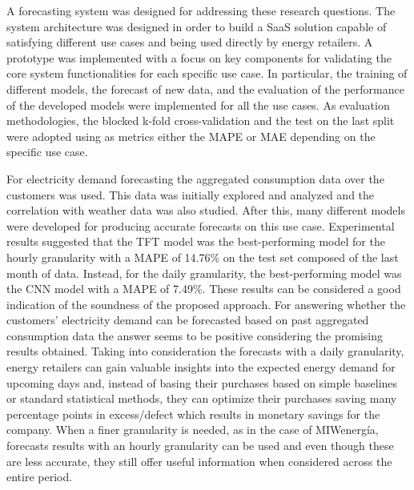 A forecasting system was designed for addressing these research questions.
The system architecture was designed in order to build a SaaS solution capable of satisfying different use cases and being used directly by energy retailers.
A prototype was implemented with a focus on key components for validating the core system functionalities for each specific use case.
In particular, the training of different models, the forecast of new data, and the evaluation of the performance of the developed models were implemented for all the use cases.
As evaluation methodologies, the blocked k-fold cross-validation and the test on the last split were adopted using as metrics either the MAPE or MAE depending on the specific use case.

For electricity demand forecasting the aggregated consumption data over the customers was used.
This data was initially explored and analyzed and the correlation with weather data was also studied.
After this, many different models were developed for producing accurate forecasts on this use case.
Experimental results suggested that the TFT model was the best-performing model for the hourly granularity with a MAPE of 14.76\% on the test set composed of the last month of data.
Instead, for the daily granularity, the best-performing model was the CNN model with a MAPE of 7.49\%.
These results can be considered a good indication of the soundness of the proposed approach.
For answering whether the customers' electricity demand can be forecasted based on past aggregated consumption data the answer seems to be positive considering the promising results obtained.
Taking into consideration the forecasts with a daily granularity, energy retailers can gain valuable insights into the expected energy demand for upcoming days and, instead of basing their purchases based on simple baselines or standard statistical methods, they can optimize their purchases saving many percentage points in excess/defect which results in monetary savings for the company.
When a finer granularity is needed, as in the case of MIWenergía, forecasts results with an hourly granularity can be used and even though these are less accurate, they still offer useful information when considered across the entire period.

